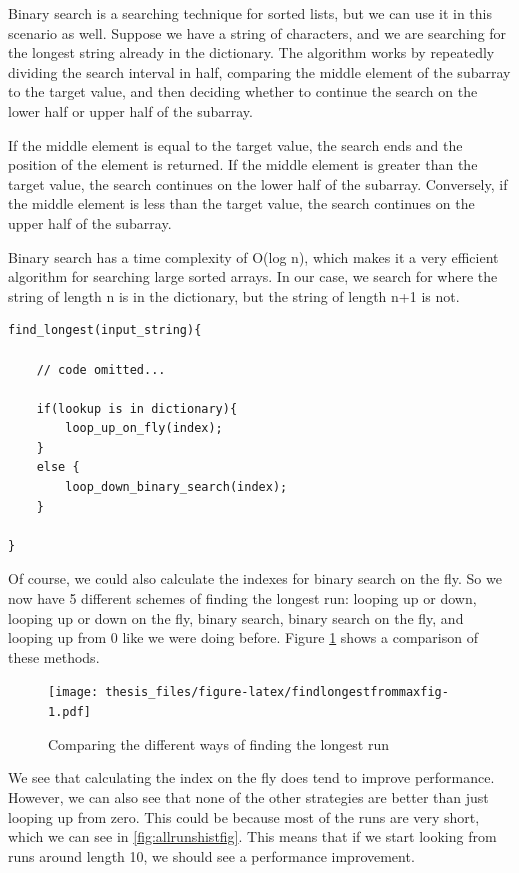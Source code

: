 \documentclass[12pt,twoside]{reedthesis}
\begin{document}
Binary search is a searching technique for sorted lists, but we can use it in this scenario as well. Suppose we have a string of characters, and we are searching for the longest string already in the dictionary. The algorithm works by repeatedly dividing the search interval in half, comparing the middle element of the subarray to the target value, and then deciding whether to continue the search on the lower half or upper half of the subarray.

If the middle element is equal to the target value, the search ends and the position of the element is returned. If the middle element is greater than the target value, the search continues on the lower half of the subarray. Conversely, if the middle element is less than the target value, the search continues on the upper half of the subarray.

Binary search has a time complexity of O(log n), which makes it a very efficient algorithm for searching large sorted arrays. In our case, we search for where the string of length n is in the dictionary, but the string of length n+1 is not.
\begin{verbatim}
find_longest(input_string){

    // code omitted...

    if(lookup is in dictionary){
        loop_up_on_fly(index);
    }
    else {
        loop_down_binary_search(index);
    }
    
}
\end{verbatim}
Of course, we could also calculate the indexes for binary search on the fly. So we now have 5 different schemes of finding the longest run: looping up or down, looping up or down on the fly, binary search, binary search on the fly, and looping up from 0 like we were doing before. Figure \ref{fig:findlongestfrommaxfig} shows a comparison of these methods.
\begin{figure}
\centering
\texttt{[image: thesis\_files/figure-latex/findlongestfrommaxfig-1.pdf]}
\caption{\label{fig:findlongestfrommaxfig}Comparing the different ways of finding the longest run}
\end{figure}
We see that calculating the index on the fly does tend to improve performance. However, we can also see that none of the other strategies are better than just looping up from zero. This could be because most of the runs are very short, which we can see in \ref{fig:allrunshistfig}. This means that if we start looking from runs around length 10, we should see a performance improvement.
\end{document}
